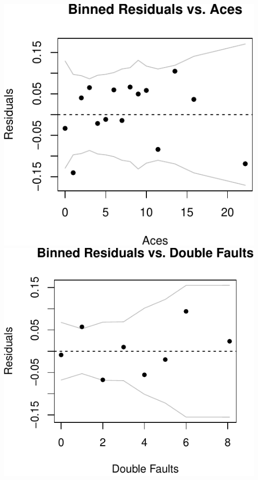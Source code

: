 \documentclass[]{article}
\begin{document}
\includegraphics{Project_files/figure-latex/unnamed-chunk-23-3.pdf}
\includegraphics{Project_files/figure-latex/unnamed-chunk-23-4.pdf}
\end{document}
